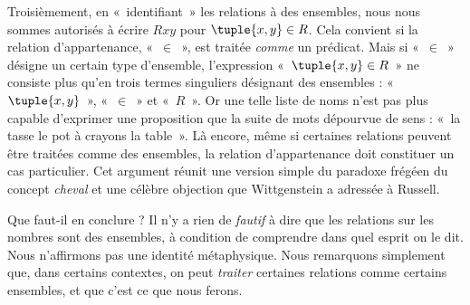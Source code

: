 \documentclass[../../../include/open-logic-section]{subfiles}
\begin{document}
Troisièmement, en «~identifiant~» les relations à des ensembles,
nous nous sommes autorisés à écrire $Rxy$ pour
$\tuple{x,y} \in R$. Cela convient si la relation
d'appartenance, «~$\in$~», est traitée \emph{comme} un prédicat.
Mais si «~$\in$~» désigne un certain type d'ensemble,
l'expression «~$\tuple{x,y} \in R$~» ne consiste plus
qu'en trois termes singuliers désignant des ensembles :
«~$\tuple{x,y}$~», «~$\in$~» et «~$R$~».
Or une telle liste de noms n'est pas plus capable d'exprimer
une proposition que la suite de mots dépourvue de sens :
«~la tasse le pot à crayons la table~».
Là encore, même si certaines relations peuvent être traitées
comme des ensembles, la relation d'appartenance doit constituer
un cas particulier. Cet argument réunit une version simple
du paradoxe frégéen du concept \emph{cheval} et une célèbre
objection que Wittgenstein a adressée à Russell.

Que faut-il en conclure ?
Il n'y a rien de \emph{fautif} à dire que les relations sur
les nombres sont des ensembles, à condition de comprendre
dans quel esprit on le dit. Nous n'affirmons pas une identité
métaphysique. Nous remarquons simplement que, dans certains
contextes, on peut \emph{traiter} certaines relations comme
certains ensembles, et que c'est ce que nous ferons.
\end{document}
